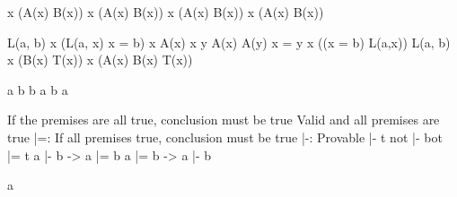 \forll x (A(x) \to B(x))
\exists x (A(x) \land B(x))
\neg \exists x (A(x) \land B(x))
\neg \forall x (A(x) \to B(x))

L(a, b) \land \forall x (L(a, x) \to x = b)
\exists x A(x)
\forall x \forall y A(x) \land A(y) \to x = y
\forall x (\neg (x = b) \to L(a,x)) \land \neg L(a, b)
\forall x (B(x) \to \neg T(x)) \land \forall x (A(x) \land \neg B(x) \to T(x))

a \to b
b \to a
\neg b \to a

If the premises are all true, conclusion must be true
Valid and all premises are true
|=: If all premises true, conclusion must be true
|-: Provable
|- t
not |- bot
|= t
a |- b -> a |= b
a |= b -> a |- b



a





